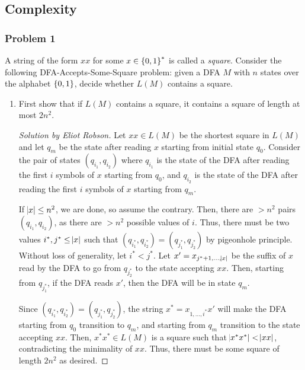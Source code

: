 \documentclass{article}
\newenvironment{solution}[1]{\begin{proof}[Solution by #1]}{\end{proof}}
\begin{document}
\subsection{Complexity}

\subsubsection{Problem 1}
A string of the form \(xx\) for some \(x \in \set{0,1}^*\) is called a \emph{square}. Consider the following \textsf{DFA-Accepts-Some-Square} problem: given a DFA \(M\) with \(n\) states over the alphabet \(\set{0,1}\), decide whether \(L(M)\) contains a square.

\begin{enumerate}
    \item First show that if \(L(M)\) contains a square, it contains a square of length at most \(2n^2\).
    
    \begin{solution}{Eliot Robson}
        Let \(xx \in L(M)\) be the shortest square in \(L(M)\) and let \(q_m\) be the state after reading \(x\) starting from initial state \(q_0\). Consider the pair of states \((q_{i_1}, q_{i_2})\) where \(q_{i_1}\) is the state of the DFA after reading the first \(i\) symbols of \(x\) starting from \(q_0\), and \(q_{i_2}\) is the state of the DFA after reading the first \(i\) symbols of \(x\) starting from \(q_m\).
        
        If \(\abs{x} \leq n^2\), we are done, so assume the contrary. Then, there are \(> n^2\) pairs \((q_{i_1}, q_{i_2})\), as there are \(> n^2\) possible values of \(i\). Thus, there must be two values \(i^*, j^* \leq \abs{x}\) such that \((q_{i^*_1}, q_{i^*_2}) = (q_{j^*_1}, q_{j^*_2})\) by pigeonhole principle. Without loss of generality, let \(i^* < j^*\). Let \(x' = x_{j^*+1, \dots, \abs{x}}\) be the suffix of \(x\) read by the DFA to go from \(q_{j^*_2}\) to the state accepting \(xx\). Then, starting from \(q_{j^*_1}\), if the DFA reads \(x'\), then the DFA will be in state \(q_m\).
        
        Since \((q_{i^*_1}, q_{i^*_2}) = (q_{j^*_1}, q_{j^*_2})\), the string \(x^* = x_{1, \dots, i^*} x'\) will make the DFA starting from \(q_0\) transition to \(q_m\), and starting from \(q_m\) transition to the state accepting \(xx\). Then, \(x^* x^* \in L(M)\) is a square such that \(\abs{x^* x^*} < \abs{xx}\), contradicting the minimality of \(xx\). Thus, there must be some square of length \(2 n^2\) as desired.
    \end{solution}
    

\end{enumerate}
\end{document}
